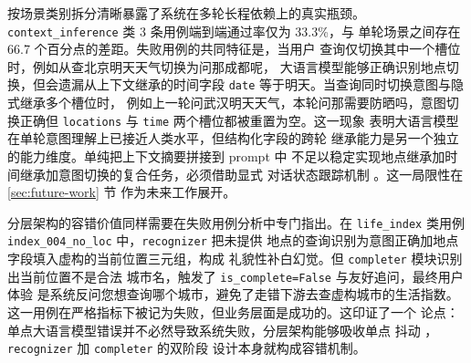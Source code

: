 按场景类别拆分清晰暴露了系统在多轮长程依赖上的真实瓶颈。
\texttt{context\_\bk{}inference} 类 3 条用例端到端通过率仅为 33.3\%，与
单轮场景之间存在 66.7 个百分点的差距。失败用例的共同特征是，当用户
查询仅切换其中一个槽位时，例如从查北京明天天气切换为问那成都呢，
大语言模型能够正确识别地点切换，但会遗漏从上下文继承的时间字段
\texttt{date} 等于明天。当查询同时切换意图与隐式继承多个槽位时，
例如上一轮问武汉明天天气，本轮问那需要防晒吗，意图切换正确但
\texttt{locations} 与 \texttt{time} 两个槽位都被重置为空。这一现象
表明大语言模型在单轮意图理解上已接近人类水平，但结构化字段的跨轮
继承能力是另一个独立的能力维度。单纯把上下文摘要拼接到 prompt 中
不足以稳定实现地点继承加时间继承加意图切换的复合任务，必须借助显式
对话状态跟踪机制 \cite{ref29}。这一局限性在 \ref{sec:future-work} 节
作为未来工作展开。

分层架构的容错价值同样需要在失败用例分析中专门指出。在 \texttt{life\_\bk{}index}
类用例 \texttt{index\_\bk{}004\_\bk{}no\_\bk{}loc} 中，\texttt{recognizer} 把未提供
地点的查询识别为意图正确加地点字段填入虚构的当前位置三元组，构成
礼貌性补白幻觉。但 \texttt{completer} 模块识别出当前位置不是合法
城市名，触发了 \texttt{is\_\bk{}complete=\bk{}False} 与友好追问，最终用户体验
是系统反问您想查询哪个城市，避免了走错下游去查虚构城市的生活指数。
这一用例在严格指标下被记为失败，但业务层面是成功的。这印证了一个
论点：单点大语言模型错误并不必然导致系统失败，分层架构能够吸收单点
抖动 \cite{ref10}，\texttt{recognizer} 加 \texttt{completer} 的双阶段
设计本身就构成容错机制。

